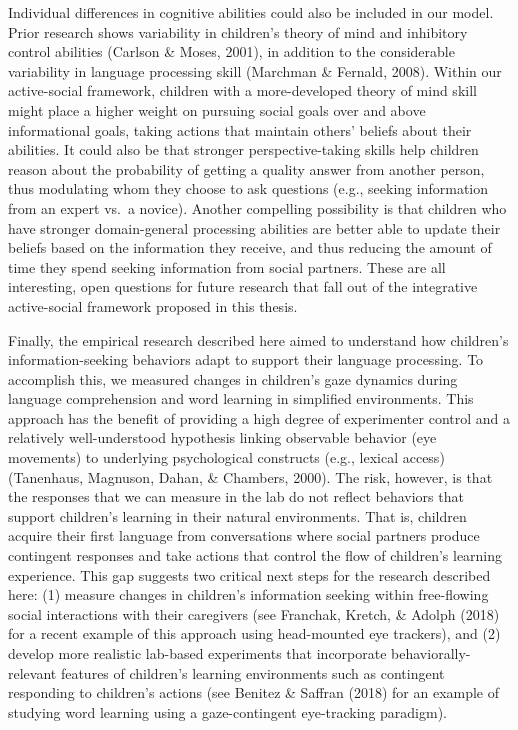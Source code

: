 \documentclass[oneside]{report}
\begin{document}
Individual differences in cognitive abilities could also be included in
our model. Prior research shows variability in children's theory of mind
and inhibitory control abilities (Carlson \& Moses, 2001), in addition
to the considerable variability in language processing skill (Marchman
\& Fernald, 2008). Within our active-social framework, children with a
more-developed theory of mind skill might place a higher weight on
pursuing social goals over and above informational goals, taking actions
that maintain others' beliefs about their abilities. It could also be
that stronger perspective-taking skills help children reason about the
probability of getting a quality answer from another person, thus
modulating whom they choose to ask questions (e.g., seeking information
from an expert vs.~a novice). Another compelling possibility is that
children who have stronger domain-general processing abilities are
better able to update their beliefs based on the information they
receive, and thus reducing the amount of time they spend seeking
information from social partners. These are all interesting, open
questions for future research that fall out of the integrative
active-social framework proposed in this thesis.

Finally, the empirical research described here aimed to understand how
children's information-seeking behaviors adapt to support their language
processing. To accomplish this, we measured changes in children's gaze
dynamics during language comprehension and word learning in simplified
environments. This approach has the benefit of providing a high degree
of experimenter control and a relatively well-understood hypothesis
linking observable behavior (eye movements) to underlying psychological
constructs (e.g., lexical access) (Tanenhaus, Magnuson, Dahan, \&
Chambers, 2000). The risk, however, is that the responses that we can
measure in the lab do not reflect behaviors that support children's
learning in their natural environments. That is, children acquire their
first language from conversations where social partners produce
contingent responses and take actions that control the flow of
children's learning experience. This gap suggests two critical next
steps for the research described here: (1) measure changes in children's
information seeking within free-flowing social interactions with their
caregivers (see Franchak, Kretch, \& Adolph (2018) for a recent example
of this approach using head-mounted eye trackers), and (2) develop more
realistic lab-based experiments that incorporate behaviorally-relevant
features of children's learning environments such as contingent
responding to children's actions (see Benitez \& Saffran (2018) for an
example of studying word learning using a gaze-contingent eye-tracking
paradigm).
\end{document}
